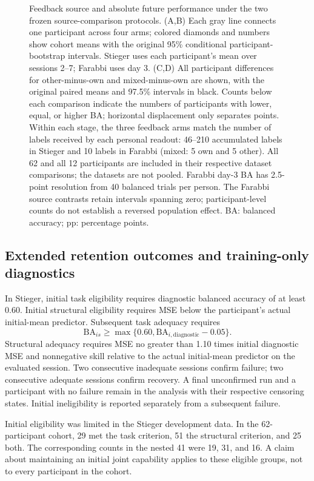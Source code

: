 \documentclass[11pt,a4paper]{article}
\newcommand{\BA}{\mathrm{BA}}
\begin{document}
\begin{figure}[tbp]
\caption{Feedback source and absolute future performance under the two frozen source-comparison protocols. (A,B) Each gray line connects one participant across four arms; colored diamonds and numbers show cohort means with the original 95\% conditional participant-bootstrap intervals. Stieger uses each participant's mean over sessions 2--7; Farabbi uses day 3. (C,D) All participant differences for other-minus-own and mixed-minus-own are shown, with the original paired means and 97.5\% intervals in black. Counts below each comparison indicate the numbers of participants with lower, equal, or higher BA; horizontal displacement only separates points. Within each stage, the three feedback arms match the number of labels received by each personal readout: 46--210 accumulated labels in Stieger and 10 labels in Farabbi (mixed: 5 own and 5 other). All 62 and all 12 participants are included in their respective dataset comparisons; the datasets are not pooled. Farabbi day-3 BA has 2.5-point resolution from 40 balanced trials per person. The Farabbi source contrasts retain intervals spanning zero; participant-level counts do not establish a reversed population effect. BA: balanced accuracy; pp: percentage points.}
\label{fig:source}
\end{figure}

\subsection{Extended retention outcomes and training-only diagnostics}
\label{sec:retention-extended}

In Stieger, initial task eligibility requires diagnostic balanced accuracy of at least 0.60. Initial structural eligibility requires MSE below the participant's actual initial-mean predictor. Subsequent task adequacy requires
\begin{equation}
 \BA_{is}\geq\max\{0.60,\BA_{i,\mathrm{diagnostic}}-0.05\}.
\end{equation}
Structural adequacy requires MSE no greater than 1.10 times initial diagnostic MSE and nonnegative skill relative to the actual initial-mean predictor on the evaluated session. Two consecutive inadequate sessions confirm failure; two consecutive adequate sessions confirm recovery. A final unconfirmed run and a participant with no failure remain in the analysis with their respective censoring states. Initial ineligibility is reported separately from a subsequent failure.


Initial eligibility was limited in the Stieger development data. In the 62-participant cohort, 29 met the task criterion, 51 the structural criterion, and 25 both. The corresponding counts in the nested 41 were 19, 31, and 16. A claim about maintaining an initial joint capability applies to these eligible groups, not to every participant in the cohort.
\end{document}
